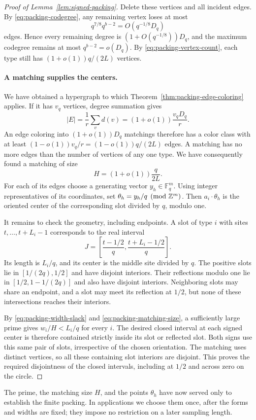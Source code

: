 \begin{proof}[Proof of Lemma~\ref{lem:signed-packing}]
Delete these vertices and all incident edges.  By
\eqref{eq:packing-codegree}, any remaining vertex loses at most
\[
 q^{7/8}q^{b-2}=O(q^{-1/8}D_q)
\]
edges.  Hence every remaining degree is $(1+O(q^{-1/8}))D_q$,
and the maximum codegree remains at most $q^{b-2}=o(D_q)$.
By \eqref{eq:packing-vertex-count}, each type still has
$(1+o(1))q/(2L)$ vertices.

\paragraph{A matching supplies the centers.}
We have obtained a hypergraph to which
Theorem~\ref{thm:packing-edge-coloring} applies.  If it has $v_q$
vertices, degree summation gives
\[
 |E|=\frac1r\sum_vd(v)=(1+o(1))\frac{v_qD_q}{r}.
\]
An edge coloring into $(1+o(1))D_q$ matchings therefore has a color
class with at least $(1-o(1))v_q/r=(1-o(1))q/(2L)$ edges.
A matching has no more edges than the number of vertices of any
one type.  We have consequently found a matching of size
\begin{equation}
 H=(1+o(1))\frac q{2L}.
 \label{eq:packing-matching-size}
\end{equation}
For each of its edges choose a generating vector $y_h\in\mathbb F_q^m$.
Using integer representatives of its coordinates, set
$\theta_h=y_h/q\pmod{\mathbb Z^m}$.  Then $a_i\cdot\theta_h$ is the
oriented center of the corresponding slot divided by $q$, modulo one.

It remains to check the geometry, including endpoints.  A slot of
type $i$ with sites $t,\ldots,t+L_i-1$ corresponds to the real interval
\[
 J=\left[\frac{t-1/2}{q},\frac{t+L_i-1/2}{q}\right].
\]
Its length is $L_i/q$, and its center is the middle site divided by
$q$.  The positive slots lie in $[1/(2q),1/2]$ and have disjoint
interiors.  Their reflections modulo one lie in
$[1/2,1-1/(2q)]$ and also have disjoint interiors.  Neighboring slots
may share an endpoint, and a slot may meet its reflection at $1/2$,
but none of these intersections reaches their interiors.

By \eqref{eq:packing-width-slack} and
\eqref{eq:packing-matching-size}, a sufficiently large prime gives
$w_i/H<L_i/q$ for every $i$.  The desired closed interval at each
signed center is therefore contained strictly inside its slot or
reflected slot.  Both signs use this same pair of slots, irrespective
of the chosen orientation.  The matching uses distinct vertices, so
all these containing slot interiors are disjoint.  This proves the
required disjointness of the closed intervals, including at $1/2$
and across zero on the circle.
\end{proof}

The prime, the matching size $H$, and the points $\theta_h$ have now
served only to establish the finite packing.  In applications we
choose them once, after the forms and widths are fixed; they impose
no restriction on a later sampling length.
